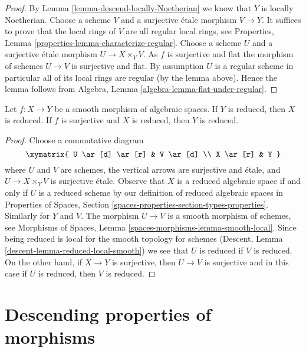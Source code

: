 \begin{proof}
By
Lemma \ref{lemma-descend-locally-Noetherian}
we know that $Y$ is locally Noetherian.
Choose a scheme $V$ and a surjective \'etale morphism $V \to Y$.
It suffices to prove that the local rings of $V$ are all regular local
rings, see
Properties, Lemma \ref{properties-lemma-characterize-regular}.
Choose a scheme $U$ and a surjective \'etale morphism
$U \to X \times_Y V$. As $f$ is surjective and flat the morphism of schemes
$U \to V$ is surjective and flat. By assumption $U$ is a regular scheme
in particular all of its local rings are regular (by the lemma above).
Hence the lemma follows from
Algebra, Lemma \ref{algebra-lemma-flat-under-regular}.
\end{proof}

\begin{lemma}
\label{lemma-reduced-local-smooth}
Let $f : X \to Y$ be a smooth morphism of algebraic spaces.
If $Y$ is reduced, then $X$ is reduced. If $f$ is surjective
and $X$ is reduced, then $Y$ is reduced.
\end{lemma}

\begin{proof}
Choose a commutative diagram
$$
\xymatrix{
U \ar[d] \ar[r] & V \ar[d] \\
X \ar[r] & Y
}
$$
where $U$ and $V$ are schemes, the vertical arrows are surjective and
\'etale, and $U \to X \times_Y V$ is surjective \'etale. Observe that $X$ is
a reduced algebraic space if and only if $U$ is a reduced scheme
by our definition of reduced algebraic spaces in
Properties of Spaces, Section \ref{spaces-properties-section-types-properties}.
Similarly for $Y$ and $V$. 
The morphism $U \to V$ is a smooth morphism of schemes, see
Morphisms of Spaces, Lemma \ref{spaces-morphisms-lemma-smooth-local}.
Since being reduced is local for the smooth topology for
schemes (Descent, Lemma \ref{descent-lemma-reduced-local-smooth})
we see that $U$ is reduced if $V$ is reduced.
On the other hand, if $X \to Y$ is surjective, then $U \to V$ is
surjective and in this case if $U$ is reduced, then $V$ is reduced.
\end{proof}







\section{Descending properties of morphisms}
\label{section-descending-properties-morphisms}

